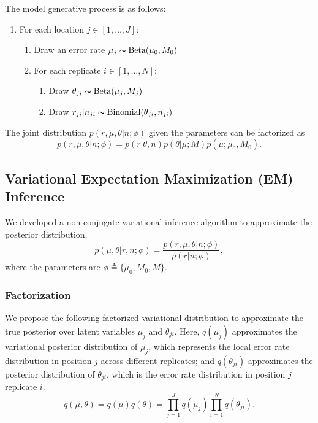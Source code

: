 \documentclass{bmcart}
\begin{document}
The model generative process is as follows:
\begin{enumerate}[noitemsep]
    \item For each location $j \in [1, \ldots, J]$:
	\begin{enumerate}
		\item Draw an error rate $\mu_j \thicksim \text{Beta}(\mu_0, M_0)$
		\item For each replicate $i \in [1, \ldots, N]$:
		\begin{enumerate}
		    \item Draw $\theta_{ji} \thicksim \text{Beta}(\mu_j, M_j)$
			\item Draw $r_{ji} | n_{ji} \thicksim \text{Binomial}(\theta_{ji}, n_{ji})$ 		
		\end{enumerate}
	\end{enumerate}
\end{enumerate}

The joint distribution $p(r, \mu, \theta|n; \phi)$ given the parameters can be factorized as
\begin{equation}
    p(r, \mu, \theta| n; \phi) = p(r |\theta, n)p(\theta |\mu; M )p(\mu;\mu_0, M_0).
\end{equation}


\subsection{Variational Expectation Maximization (EM) Inference}
We developed a non-conjugate variational inference algorithm to approximate the posterior distribution,
\begin{equation}
	p(\mu, \theta | r, n; \phi)  = \frac{ p(r, \mu, \theta| n; \phi) } {p ( r | n; \phi)},
\end{equation}
where the parameters are $\phi \triangleq \{\mu_0, M_0, M\}$.
\subsubsection{Factorization}
We propose the following factorized variational distribution to approximate the true posterior over latent variables $\mu_j$ and $\theta_{ji}$.
Here, $q(\mu_j)$ approximates the variational posterior distribution of $\mu_j$, which represents the local error rate distribution in position $j$ across different replicates;
and $q(\theta_{ji})$ approximates the posterior distribution of $\theta_{ji}$, which is the error rate distribution in position $j$ replicate $i$.
\begin{equation}
  q(\mu, \theta) = q(\mu)q(\theta) = \prod_{j=1}^J q(\mu_{j}) \prod_{i=1}^N q(\theta_{ji}).
  \label{eq:vardist}
\end{equation}
\end{document}
